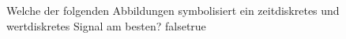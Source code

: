     {Welche der folgenden Abbildungen symbolisiert ein zeitdiskretes und wertdiskretes Signal am besten?}
    {}
    {}
    {}
    {}
    {false}{true}